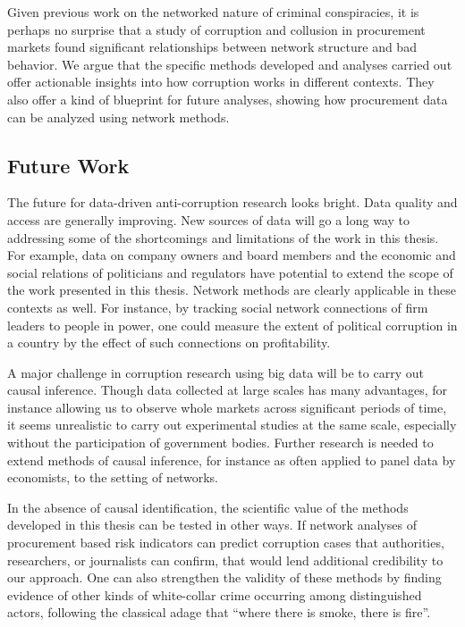 Given previous work on the networked nature of criminal conspiracies, it is perhaps no surprise that a study of corruption and collusion in procurement markets found significant relationships between network structure and bad behavior. We argue that the specific methods developed and analyses carried out offer actionable insights into how corruption works in different contexts. They also offer a kind of blueprint for future analyses, showing how procurement data can be analyzed using network methods.

\subsection*{Future Work}
The future for data-driven anti-corruption research looks bright. Data quality and access are generally improving. New sources of data will go a long way to addressing some of the shortcomings and limitations of the work in this thesis. For example, data on company owners and board members and the economic and social relations of politicians and regulators have potential to extend the scope of the work presented in this thesis. Network methods are clearly applicable in these contexts as well. For instance, by tracking social network connections of firm leaders to people in power, one could measure the extent of political corruption in a country by the effect of such connections on profitability.

A major challenge in corruption research using big data will be to carry out causal inference. Though data collected at large scales has many advantages, for instance allowing us to observe whole markets across significant periods of time, it seems unrealistic to carry out experimental studies at the same scale, especially without the participation of government bodies. Further research is needed to extend methods of causal inference, for instance as often applied to panel data by economists, to the setting of networks.

In the absence of causal identification, the scientific value of the methods developed in this thesis can be tested in other ways. If network analyses of procurement based risk indicators can predict corruption cases that authorities, researchers, or journalists can confirm, that would lend additional credibility to our approach. One can also strengthen the validity of these methods by finding evidence of other kinds of white-collar crime occurring among distinguished actors, following the classical adage that ``where there is smoke, there is fire''.

